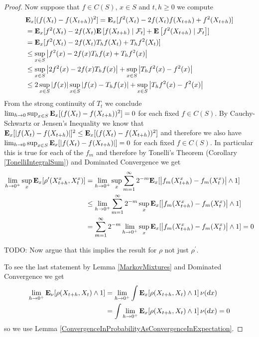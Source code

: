 \begin{proof}
Now suppose that $f \in C(S)$, $x \in S$  and $t,h \geq 0$ we compute
\begin{align*}
&\sexpectation{(f(X_t) - f(X_{t+h}))^2}{x}
=\sexpectation{f^2(X_t) - 2 f(X_t) f(X_{t+h}) + f ^2 (X_{t+h})} {x}\\
&=\sexpectation{f^2(X_t) - 2 f(X_t) \cexpectationlong{\mathcal{F}_t}{f(X_{t+h})} + \cexpectationlong{\mathcal{F}_t} {f ^2 (X_{t+h})}}{x} \\
&=\sexpectation{f^2(X_t) - 2 f(X_t) T_hf(X_{t}) + T_h f ^2 (X_{t})}{x} \\
&\leq \sup_{x \in S} \abs{f^2(x) - 2 f(x) T_hf(x) + T_h f ^2 (x)} \\
&\leq \sup_{x \in S} \abs{2f^2(x) - 2 f(x) T_hf(x)}  + \sup_{x \in S} \abs{T_h f ^2 (x) - f^2(x)} \\
&\leq 2 \sup_{x \in S}\abs{f(x)} \sup_{x \in S} \abs{f(x) - T_hf(x)}  + \sup_{x \in S} \abs{T_h f ^2 (x) - f^2(x)} \\
\end{align*}
From the strong continuity of $T_t$ we conclude $\lim_{h \to 0} \sup_{x \in S} \sexpectation{(f(X_t) - f(X_{t+h}))^2}{x} = 0$ for each fixed $f \in C(S)$.  
By Cauchy-Schwartz or Jensen's Inequality we know that $\sexpectation{\abs{f(X_t) - f(X_{t+h})}}{x}^2 \leq \sexpectation{(f(X_t) - f(X_{t+h}))^2}{x}$ and therefore we also 
have $\lim_{h \to 0} \sup_{x \in S} \sexpectation{\abs{f(X_t) - f(X_{t+h})}}{x} = 0$ for each fixed $f \in C(S)$.
In particular this is true for each
of the $f_m$ and therefore by Tonelli's Theorem (Corollary \ref{TonelliIntegralSum}) and Dominated Convergence we get
\begin{align*}
\lim_{h \to 0^+} \sup_{x} \sexpectation{\rho^\prime(X^x_{t+h}, X^x_t)}{x} 
&=\lim_{h \to 0^+} \sup_{x} \sum_{m=1}^\infty 2^{-m} \sexpectation{\abs{f_m(X^x_{t+h}) - f_m(X^x_t)} \wedge 1}{x} \\
&\leq \lim_{h \to 0^+} \sum_{m=1}^\infty 2^{-m} \sup_{x} \sexpectation{\abs{f_m(X^x_{t+h}) - f_m(X^x_t)} \wedge 1}{x} \\
&= \sum_{m=1}^\infty 2^{-m} \lim_{h \to 0^+} \sup_{x} \sexpectation{\abs{f_m(X^x_{t+h}) - f_m(X^x_t)} \wedge 1}{x} = 0\\
\end{align*}

TODO: Now argue that this implies the result for $\rho$ not just $\rho^\prime$.

To see the last statement by Lemma \ref{MarkovMixtures} and Dominated Convergence we get
\begin{align*}
\lim_{h \to 0^+} \sexpectation{\rho(X_{t+h}, X_t) \wedge 1}{\nu} &= \lim_{h \to 0^+} \int \sexpectation{\rho(X_{t+h}, X_t) \wedge 1}{x} \, \nu(dx) \\
&= \int \lim_{h \to 0^+} \sexpectation{\rho(X_{t+h}, X_t) \wedge 1}{x} \, \nu(dx) = 0
\end{align*}
so we use Lemma \ref{ConvergenceInProbabilityAsConvergenceInExpectation}.
\end{proof}

